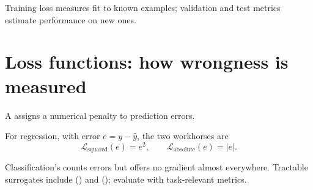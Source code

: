 \begin{keyidea}
Training loss measures fit to known examples; validation and test metrics estimate performance on new ones.
\end{keyidea}

\section{Loss functions: how wrongness is measured}

A  assigns a numerical penalty to prediction errors.

For regression, with error $e=y-\hat{y}$, the two workhorses are
\[
  \mathcal{L}_{\text{squared}}(e)=e^2,
  \qquad
  \mathcal{L}_{\text{absolute}}(e)=|e|.
\]

Classification's  counts errors but offers no gradient almost everywhere. Tractable surrogates include  () and  (); evaluate with task-relevant metrics.

